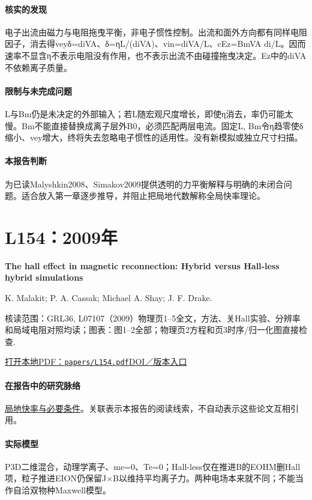 \paragraph{核实的发现}电子出流由磁力与电阻拖曳平衡，非电子惯性控制。出流和面外方向都有同样电阻因子，消去得veyδ=diVA、δ=ηL/(diVA)、vin=diVA/L、cEz=BmVA di/L。因而速率不显含η不表示电阻没有作用，也不表示出流不由碰撞拖曳决定。Ez中的diVA不依赖离子质量。

\paragraph{限制与未完成问题}L与Bm仍是未决定的外部输入；若L随宏观尺度增长，即使η消去，率仍可能太慢。Bm不能直接替换成离子层外B0，必须匹配两层电流。固定L, Bm令η趋零使δ缩小、vey增大，终将失去忽略电子惯性的适用性。没有新模拟或独立尺寸扫描。

\paragraph{本报告判断}为已读Malyshkin2008、Simakov2009提供透明的力平衡解释与明确的未闭合问题。适合放入第一章逐步推导，并阻止把局地代数解称全局快率理论。

\section{L154：2009年}\label{paper:L154}

\textbf{The hall effect in magnetic reconnection: Hybrid versus Hall‐less hybrid simulations}\citep{L154}\

K. Malakit;  P. A. Cassak;  Michael A. Shay;  J. F. Drake.

\textsf{核读范围：}GRL36, L07107（2009）物理页1–5全文，方法、关Hall实验、分辨率和局域电阻对照均读；\textsf{图表：}图1–2全部；物理页2方程和页3时序/归一化图直接检查.

\href{run:papers/L154.pdf}{打开本地PDF：\texttt{papers/L154.pdf}}\quad\href{https://doi.org/10.1029/2009gl037538}{DOI／版本入口}

\paragraph{在报告中的研究脉络}\hyperref[story:fast]{局地快率与必要条件}。关联表示本报告的阅读线索，不自动表示这些论文互相引用。

\paragraph{实际模型}P3D二维混合，动理学离子、me=0、Te=0；Hall-less仅在推进B的EOHM删Hall项，粒子推进EION仍保留J×B以维持平均离子力。两种电场本来就不同；不能当作自洽双物种Maxwell模型。

